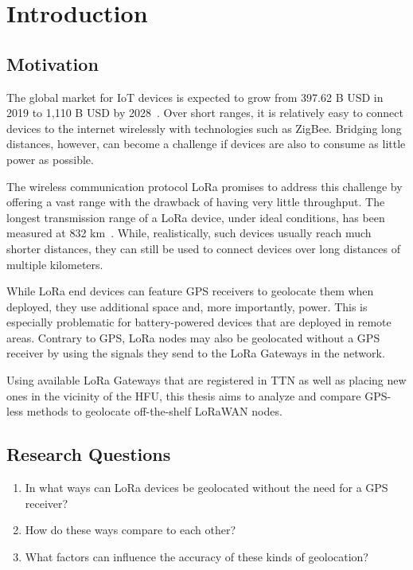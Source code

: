 \chapter{Introduction}

\section{Motivation}

The global market for IoT devices is expected to grow from 397.62 B USD in 2019 to 1,110 B USD by 2028~\cite{grand_view_research_global_2022}.
Over short ranges, it is relatively easy to connect devices to the internet wirelessly with technologies such as ZigBee.
Bridging long distances, however, can become a challenge if devices are also to consume as little power as possible.

The wireless communication protocol \ac{LoRa} promises to address this challenge by offering a vast range with the drawback of having very little throughput.
The longest transmission range of a \ac{LoRa} device, under ideal conditions, has been measured at 832 km~\cite{the_things_network_global_team_lora_nodate}.
While, realistically, such devices usually reach much shorter distances, they can still be used to connect devices over long distances of multiple kilometers.

While \ac{LoRa} end devices can feature \ac{GPS} receivers to geolocate them when deployed, they use additional space and, more importantly, power.
This is especially problematic for battery-powered devices that are deployed in remote areas.
Contrary to \ac{GPS}, \ac{LoRa} nodes may also be geolocated without a GPS receiver by using the signals they send to the \ac{LoRa} Gateways in the network.

Using available \ac{LoRa} Gateways that are registered in \acf{TTN} as well as placing new ones in the vicinity of the \acf{HFU}, this thesis aims to analyze and compare \ac{GPS}-less methods to geolocate off-the-shelf \ac{LoRaWAN} nodes.

\section{Research Questions}

\begin{enumerate}
    \item In what ways can \ac{LoRa} devices be geolocated without the need for a GPS receiver?
    \item How do these ways compare to each other?
    \item What factors can influence the accuracy of these kinds of geolocation?
\end{enumerate}

